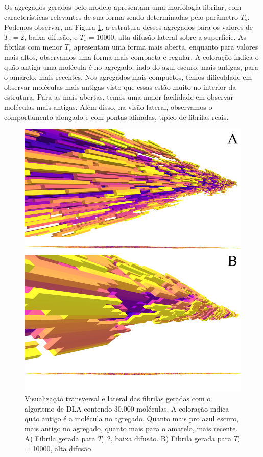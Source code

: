 \documentclass{article}
\begin{document}
    Os agregados gerados pelo modelo apresentam uma morfologia fibrilar, com características relevantes de sua forma 
    sendo determinadas pelo parâmetro \(T_{s}\). Podemos observar, na Figura \ref{R1}, a estrutura desses agregados 
    para os valores de \(T_{s} = 2\), baixa difusão, e \(T_{s} = 10000\), alta difusão lateral sobre a superfície. As 
    fibrilas com menor \(T_{s}\) apresentam uma forma mais aberta, enquanto para valores mais altos, observamos uma 
    forma mais compacta e regular. A coloração indica o quão antiga uma molécula é no agregado, indo do azul escuro, 
    mais antigas, para o amarelo, mais recentes. Nos agregados mais compactos, temos dificuldade em observar moléculas
    mais antigas visto que essas estão muito no interior da estrutura. Para as mais abertas, temos uma maior facilidade
    em observar moléculas mais antigas. Além disso, na visão lateral, observamos o comportamento alongado e com pontas 
    afinadas, típico de fibrilas reais. 

    \begin{figure}[H]
        \centering
        \includegraphics[width=\textwidth]{figures/fibrils.png}

        \caption{Visualização transversal e lateral das fibrilas geradas com o algoritmo de DLA contendo 30.000 moléculas.
        A coloração indica quão antigo é a molécula no agregado. Quanto mais pro azul escuro, 
        mais antigo no agregado, quanto mais para o amarelo, mais recente. 
        A) Fibrila gerada para \(T_{s}\) 2, baixa difusão. B) Fibrila gerada para \(T_{s}\) = 10000, alta difusão.} 

        \label{R1}
    \end{figure}
\end{document}

